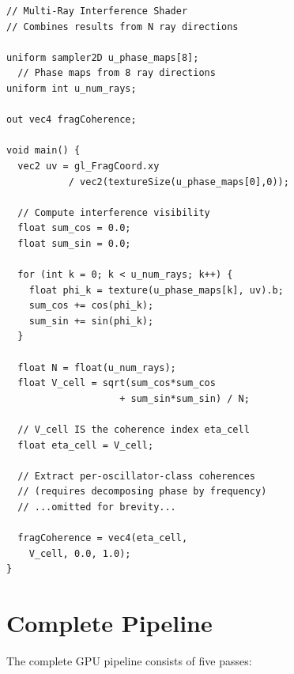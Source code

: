 \documentclass[11pt,twocolumn,a4paper]{article}
\begin{document}
\begin{lstlisting}[style=glsl,caption={Multi-ray interference shader
  (GLSL pseudocode)},
  label={lst:multi-ray}]
// Multi-Ray Interference Shader
// Combines results from N ray directions

uniform sampler2D u_phase_maps[8];
  // Phase maps from 8 ray directions
uniform int u_num_rays;

out vec4 fragCoherence;

void main() {
  vec2 uv = gl_FragCoord.xy
           / vec2(textureSize(u_phase_maps[0],0));

  // Compute interference visibility
  float sum_cos = 0.0;
  float sum_sin = 0.0;

  for (int k = 0; k < u_num_rays; k++) {
    float phi_k = texture(u_phase_maps[k], uv).b;
    sum_cos += cos(phi_k);
    sum_sin += sin(phi_k);
  }

  float N = float(u_num_rays);
  float V_cell = sqrt(sum_cos*sum_cos
                    + sum_sin*sum_sin) / N;

  // V_cell IS the coherence index eta_cell
  float eta_cell = V_cell;

  // Extract per-oscillator-class coherences
  // (requires decomposing phase by frequency)
  // ...omitted for brevity...

  fragCoherence = vec4(eta_cell,
    V_cell, 0.0, 1.0);
}
\end{lstlisting}


\section{Complete Pipeline}
\label{sec:pipeline}

The complete GPU pipeline consists of five passes:
\end{document}
